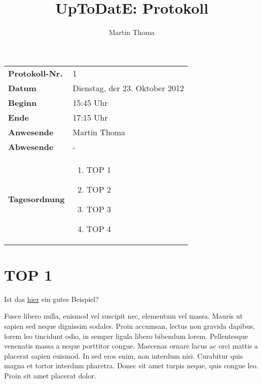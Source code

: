 \documentclass[11pt,a4paper,oneside]{scrartcl}
\newcommand\yourTitle{UpToDatE: Protokoll}
\newcommand\protokollNr{1}
\newcommand\Schriftfuehrer{Martin Thoma}
\begin{document}
 \author{\Schriftfuehrer}
 \title{\yourTitle}


\begin{center}
    \begin{tabular}{p{4.0cm} p{11.2cm}}
        \textbf{Protokoll-Nr.}      & \protokollNr\\
        \textbf{Datum}              & Dienstag, der 23. Oktober 2012\\
        \textbf{Beginn}             & 15:45 Uhr\\
        \textbf{Ende}               & 17:15 Uhr\\
        \textbf{Anwesende}          & Martin Thoma\\
        \textbf{Abwesende}          & -\\
        \textbf{Tagesordnung}       & \vspace{-7mm}%
                \begin{enumerate}[leftmargin=1.3em]%
                    \setlength{\itemsep}{-2pt}%
                    \item TOP 1
                    \item TOP 2
                    \item TOP 3
                    \item TOP 4
                \end{enumerate}
    \end{tabular}
\end{center}

\section{TOP 1}
Ist das \href{http://www.digitale-schule-bayern.de/dsdaten/8/825.pdf}{hier}
ein gutes Beispiel?

Fusce libero nulla, euismod vel suscipit nec, elementum vel massa. 
Mauris ut sapien sed neque dignissim sodales. Proin accumsan, lectus 
non gravida dapibus, lorem leo tincidunt odio, in semper ligula 
libero bibendum lorem. Pellentesque venenatis massa a neque porttitor
congue. Maecenas ornare lacus ac orci mattis a placerat sapien 
euismod. In sed eros enim, non interdum nisi. Curabitur quis magna 
et tortor interdum pharetra. Donec sit amet turpis neque, quis congue
leo. Proin sit amet placerat dolor.
\end{document}
